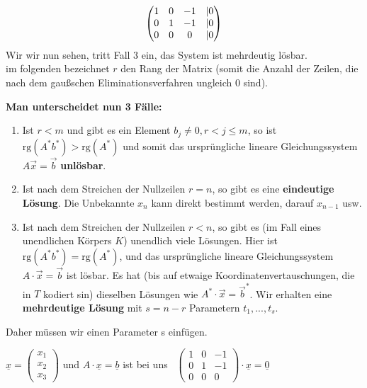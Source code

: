 \begin{uebsp}
\begin{Answer}
\begin{equation*}
\left(\begin{matrix}1&0&-1&\text{{\textbar}}0\\0&1&-1&\text{{\textbar}}0\\0&0&0&\text{{\textbar}}0\end{matrix}\right)
\end{equation*}
Wir wir nun sehen, tritt Fall 3 ein, das System ist mehrdeutig lösbar.\\

im folgenden bezeichnet $r$ den Rang der Matrix (somit die Anzahl der Zeilen, die nach dem gaußschen Eliminationsverfahren ungleich $0$ sind).

\begin{uebsp_theory}
\textbf{Man unterscheidet nun 3 Fälle:}
\begin{enumerate}[1.]
    \item Ist $r<m$ und gibt es ein Element $b_j\neq 0, r<j\leq m$, so ist $\text{rg}(A^* b^*)>\text{rg}(A^*)$ und somit das ursprüngliche lineare Gleichungssystem $A\vec x=\vec b$ \textbf{unlösbar}.
    \item Ist nach dem Streichen der Nullzeilen $r=n$, so gibt es eine \textbf{eindeutige Lösung}.
        Die Unbekannte $x_n$ kann direkt bestimmt werden, darauf $x_{n-1}$ usw.
    \item Ist nach dem Streichen der Nullzeilen $r<n$, so gibt es (im Fall eines unendlichen Körpers $K$) unendlich viele Lösungen. Hier ist $\text{rg}(A^*b^*)=\text{rg}(A^*)$, und das ursprüngliche lineare Gleichungssystem $A\cdot \vec x=\vec b$ ist lösbar. Es hat (bis auf etwaige Koordinatenvertauschungen, die in $T$ kodiert sin) dieselben Lösungen wie $A^*\cdot \vec x=\vec b^*$. Wir erhalten eine \textbf{mehrdeutige Lösung} mit $s=n-r$ Parametern $t_1,...,t_s$.
\end{enumerate}
\end{uebsp_theory}

{Daher m\"ussen wir einen
Parameter s einf\"ugen.}



{

$\underline{{x}}=\left(\begin{matrix}x_{1}\\x_{2}\\x_{3}\end{matrix}\right)$
und  $A\cdot \underline{{x}}=\underline{{b}}$  ist bei uns \ 
$\left(\begin{matrix}1&0&-1\\0&1&-1\\0&0&0\end{matrix}\right)\cdot
\underline{{x}}=\underline{{0}}$ }



\end{Answer}
\end{uebsp}

